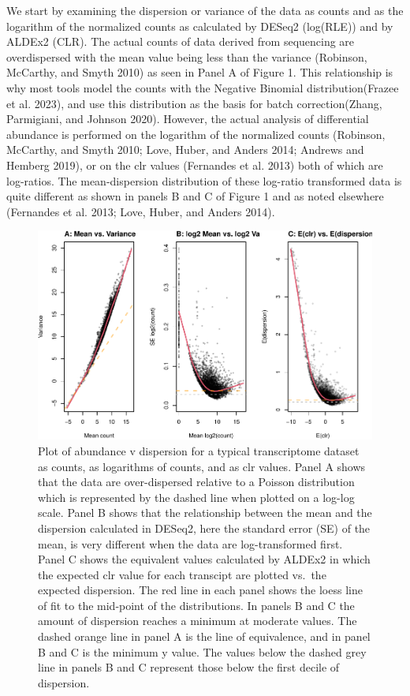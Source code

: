 \documentclass[
]{article}
\begin{document}
We start by examining the dispersion or variance of the data as counts
and as the logarithm of the normalized counts as calculated by DESeq2
(log(RLE)) and by ALDEx2 (CLR). The actual counts of data derived from
sequencing are overdispersed with the mean value being less than the
variance (Robinson, McCarthy, and Smyth 2010) as seen in Panel A of
Figure 1. This relationship is why most tools model the counts with the
Negative Binomial distribution(Frazee et al. 2023), and use this
distribution as the basis for batch correction(Zhang, Parmigiani, and
Johnson 2020). However, the actual analysis of differential abundance is
performed on the logarithm of the normalized counts (Robinson, McCarthy,
and Smyth 2010; Love, Huber, and Anders 2014; Andrews and Hemberg 2019),
or on the clr values (Fernandes et al. 2013) both of which are
log-ratios. The mean-dispersion distribution of these log-ratio
transformed data is quite different as shown in panels B and C of Figure
1 and as noted elsewhere (Fernandes et al. 2013; Love, Huber, and Anders
2014).

\begin{figure}
\centering
\includegraphics{go3_files/figure-latex/dispersion-1.pdf}
\caption{Plot of abundance v dispersion for a typical transcriptome
dataset as counts, as logarithms of counts, and as clr values. Panel A
shows that the data are over-dispersed relative to a Poisson
distribution which is represented by the dashed line when plotted on a
log-log scale. Panel B shows that the relationship between the mean and
the dispersion calculated in DESeq2, here the standard error (SE) of the
mean, is very different when the data are log-transformed first. Panel C
shows the equivalent values calculated by ALDEx2 in which the expected
clr value for each transcipt are plotted vs.~the expected dispersion.
The red line in each panel shows the loess line of fit to the mid-point
of the distributions. In panels B and C the amount of dispersion reaches
a minimum at moderate values. The dashed orange line in panel A is the
line of equivalence, and in panel B and C is the minimum y value. The
values below the dashed grey line in panels B and C represent those
below the first decile of dispersion.}
\end{figure}
\end{document}
